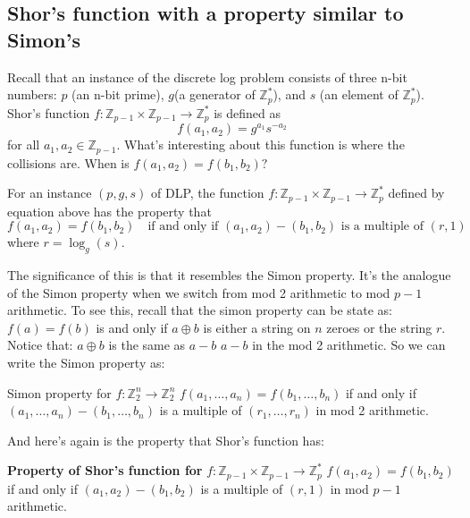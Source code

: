 \subsection{Shor's function with a property similar to Simon's}
Recall that an instance of the discrete log problem consists of three n-bit numbers: $p$ (an n-bit prime), $g$(a generator of $\mathbb{Z}_p^*$), and $s$ (an element of $\mathbb{Z}_p^*$).
Shor's function $f:\mathbb{Z}_{p-1}\times \mathbb{Z}_{p-1} \rightarrow \mathbb{Z}_p^*$ is defined as
\[
f(a_1,a_2)=g^{a_1}s^{-a_2}
\]
for all $a_1,a_2 \in\mathbb{Z}_{p-1}$. What's interesting about this function is where the collisions are. When is $f(a_1,a_2)=f(b_1,b_2)?$
\begin{theorem}
    For an instance $(p,g,s)$ of DLP, the function $f:\mathbb{Z}_{p-1}\times \mathbb{Z}_{p-1}\rightarrow \mathbb{Z}_p^*$ defined by equation above has the property that
    \[
    f(a_1,a_2)=f(b_1,b_2) \quad \text{if and only if $(a_1,a_2)-(b_1,b_2)$ is a multiple of $(r,1)$}
    \]
    where $r=\log_g(s)$.
\end{theorem}
The significance of this is that it resembles the Simon property. It's the analogue of the Simon property when we switch from mod 2 arithmetic to mod $p-1$ arithmetic. To see this, recall that the simon property can be state as: $f(a)=f(b)$ is and only if $a \oplus b$ is either a string on $n$ zeroes or the string $r$. Notice that: $a\oplus b$ is the same as $a-b$ $a-b$ in the mod 2 arithmetic. So we can write the Simon property as:

Simon property for $f:\mathbb{Z}_2^n\rightarrow \mathbb{Z}_2^n$
$f(a_1,\ldots,a_n)=f(b_1,\ldots,b_n)$ if and only if $(a_1,\ldots,a_n)-(b_1,\ldots,b_n)$ is a multiple of $(r_1,\ldots,r_n)$ in mod 2 arithmetic.

And here's again is the property that Shor's function has:

\textbf{Property of Shor's function for} $f:\mathbb{Z}_{p-1}\times \mathbb{Z}_{p-1}\rightarrow \mathbb{Z}_p^*$ $f(a_1,a_2)=f(b_1,b_2)$ if and only if $(a_1,a_2)-(b_1,b_2)$ is a multiple of $(r,1)$ in mod $p-1$ arithmetic.

